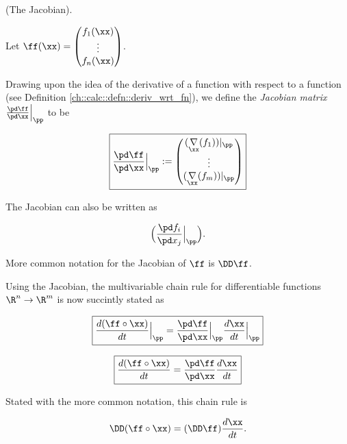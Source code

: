 \begin{defn}
\label{ch::calc::defn::jacobian}
    (The Jacobian).
    
    Let $\ff(\xx) = \begin{pmatrix} f_1(\xx) \\ \vdots \\ f_n(\xx) \end{pmatrix}$.
    
    Drawing upon the idea of the derivative of a function with respect to a function (see Definition \ref{ch::calc::defn::deriv_wrt_fn}), we define the \textit{Jacobian matrix} $\frac{\pd \ff}{\pd \xx}\Big|_\pp$ to be
    
    \begin{align*}
        \boxed
        {
            \frac{\pd \ff}{\pd \xx}\Big|_\pp
            :=
            \begin{pmatrix}
                (\underset{\xx}{\nabla} (f_1))|_\pp
                \\
                \vdots
                \\
                (\underset{\xx}{\nabla} (f_m))|_\pp
            \end{pmatrix}
        }
    \end{align*}
    
    The Jacobian can also be written as

    \begin{align*}
        \Big( \frac{\pd f_i}{\pd x_j}\Big|_\pp \Big).
    \end{align*}

    More common notation for the Jacobian of $\ff$ is $\DD \ff$.
    
    Using the Jacobian, the multivariable chain rule for differentiable functions $\R^n \rightarrow \R^m$ is now succintly stated as
    
    \begin{align*}
        \boxed
        {
            \frac{d (\ff \circ \xx)}{dt}\Big|_\pp = \frac{\pd\ff}{\pd\xx}\Big|_\pp \frac{d\xx}{dt}\Big|_\pp
        }
    \end{align*}
    
    \begin{align*}
        \boxed
        {
            \frac{d (\ff \circ \xx)}{dt} = \frac{\pd\ff}{\pd\xx} \frac{d\xx}{dt}
        }
    \end{align*}

    Stated with the more common notation, this chain rule is

    \begin{align*}
        \DD(\ff \circ \xx) = (\DD \ff) \frac{d\xx}{dt}. 
    \end{align*}
\end{defn}


